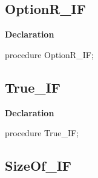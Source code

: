 \documentclass{report}
\newif\ifpdf
\begin{document}
\subsection*{OptionR{\_}IF}
\fi
\label{ok_if_expressions-OptionR_IF}
\begin{list}{}{
\setlength{\itemindent}{0cm}
\setlength{\listparindent}{0cm}
\setlength{\leftmargin}{\evensidemargin}
\addtolength{\leftmargin}{\tmplength}
\settowidth{\labelsep}{X}
\addtolength{\leftmargin}{\labelsep}
\setlength{\labelwidth}{\tmplength}
}
\item[\textbf{Declaration}\hfill]
\ifpdf
\begin{flushleft}
\fi
\begin{ttfamily}
procedure OptionR{\_}IF;\end{ttfamily}

\ifpdf
\end{flushleft}
\fi

\end{list}
\ifpdf
\subsection*{\large{\textbf{True{\_}IF}}\normalsize\hspace{1ex}\hrulefill}
\else
\subsection*{True{\_}IF}
\fi
\label{ok_if_expressions-True_IF}
\begin{list}{}{
\setlength{\itemindent}{0cm}
\setlength{\listparindent}{0cm}
\setlength{\leftmargin}{\evensidemargin}
\addtolength{\leftmargin}{\tmplength}
\settowidth{\labelsep}{X}
\addtolength{\leftmargin}{\labelsep}
\setlength{\labelwidth}{\tmplength}
}
\item[\textbf{Declaration}\hfill]
\ifpdf
\begin{flushleft}
\fi
\begin{ttfamily}
procedure True{\_}IF;\end{ttfamily}

\ifpdf
\end{flushleft}
\fi

\end{list}
\ifpdf
\subsection*{\large{\textbf{SizeOf{\_}IF}}\normalsize\hspace{1ex}\hrulefill}
\else
\end{document}
